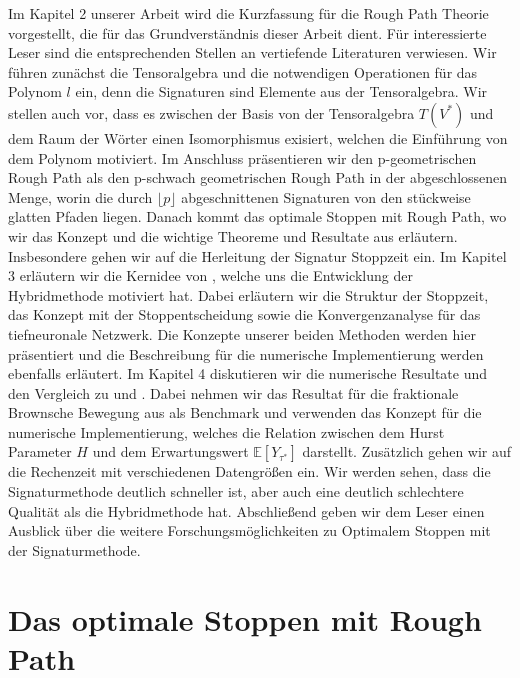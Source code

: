 \documentclass[12pt,titlepage,headsepline]{article}
\begin{document}
    \hfill\break
    Im Kapitel 2 unserer Arbeit wird die Kurzfassung für die Rough Path Theorie vorgestellt, die für das Grundverständnis dieser Arbeit dient. Für interessierte Leser sind die entsprechenden Stellen an vertiefende Literaturen verwiesen. Wir führen zunächst die Tensoralgebra und die notwendigen Operationen für das Polynom $l$ ein, denn die Signaturen sind Elemente aus der Tensoralgebra. Wir stellen auch vor, dass es zwischen der Basis von der Tensoralgebra $T(V^*)$ und dem Raum der Wörter einen Isomorphismus exisiert, welchen die Einführung von dem Polynom motiviert. Im Anschluss präsentieren wir den p-geometrischen Rough Path als den p-schwach geometrischen Rough Path in der abgeschlossenen Menge, worin die durch $\lfloor p \rfloor$ abgeschnittenen Signaturen von den stückweise glatten Pfaden liegen. Danach kommt das optimale Stoppen mit Rough Path, wo wir das Konzept und die wichtige Theoreme und Resultate aus \cite{bayer_optimal_2020} erläutern. Insbesondere gehen wir auf die Herleitung der Signatur Stoppzeit ein.
    Im Kapitel 3 erläutern wir die Kernidee von \cite{becker_deep_2019}, welche uns die Entwicklung der Hybridmethode motiviert hat. Dabei erläutern wir die Struktur der Stoppzeit, das Konzept mit der Stoppentscheidung sowie die Konvergenzanalyse für das tiefneuronale Netzwerk. Die Konzepte unserer beiden Methoden werden hier präsentiert und die Beschreibung für die numerische Implementierung werden ebenfalls erläutert.
    Im Kapitel 4 diskutieren wir die numerische Resultate und den Vergleich zu \cite{bayer_optimal_2020} und \cite{becker_deep_2019}. Dabei nehmen wir das Resultat für die fraktionale Brownsche Bewegung aus \cite{becker_deep_2019} als Benchmark und verwenden das Konzept für die numerische Implementierung, welches die Relation zwischen dem Hurst Parameter $H$ und dem Erwartungswert $\mathbb{E}[Y_{\tau^*}]$ darstellt. Zusätzlich gehen wir auf die Rechenzeit mit verschiedenen Datengrößen ein. Wir werden sehen, dass die Signaturmethode deutlich schneller ist, aber auch eine deutlich schlechtere Qualität als die Hybridmethode hat.
    Abschließend geben wir dem Leser einen Ausblick über die weitere Forschungsmöglichkeiten zu Optimalem Stoppen mit der Signaturmethode.
    \newpage

    \section{Das optimale Stoppen mit Rough Path}\label{chapter: opt_stop_with_rough_path}
\end{document}
